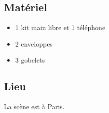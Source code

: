 	
	\subsection{Matériel}
	
	\begin{itemize}
	\item 1 kit main libre et 1 téléphone
	\item 2 enveloppes
	\item 3 gobelets
	\end{itemize}
	
	\subsection{Lieu}
	
	La scène est à Paris.